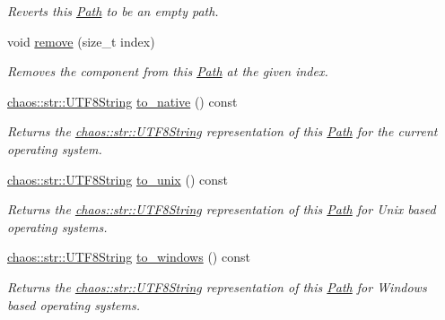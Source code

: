 \begin{DoxyCompactItemize}
\begin{DoxyCompactList}\small\item\em Reverts this \hyperlink{classchaos_1_1io_1_1file_1_1_path}{Path} to be an empty path. \end{DoxyCompactList}\item 
void \hyperlink{classchaos_1_1io_1_1file_1_1_path_a0155409783770f5db3f6303cd5191840}{remove} (size\+\_\+t index)
\begin{DoxyCompactList}\small\item\em Removes the component from this \hyperlink{classchaos_1_1io_1_1file_1_1_path}{Path} at the given index. \end{DoxyCompactList}\item 
\hyperlink{classchaos_1_1str_1_1_u_t_f8_string}{chaos\+::str\+::\+U\+T\+F8\+String} \hyperlink{classchaos_1_1io_1_1file_1_1_path_a7e156426c4f08f1798d0138c24bd9147}{to\+\_\+native} () const 
\begin{DoxyCompactList}\small\item\em Returns the \hyperlink{classchaos_1_1str_1_1_u_t_f8_string}{chaos\+::str\+::\+U\+T\+F8\+String} representation of this \hyperlink{classchaos_1_1io_1_1file_1_1_path}{Path} for the current operating system. \end{DoxyCompactList}\item 
\hyperlink{classchaos_1_1str_1_1_u_t_f8_string}{chaos\+::str\+::\+U\+T\+F8\+String} \hyperlink{classchaos_1_1io_1_1file_1_1_path_a348fc601d312d89c054cd5e02ff97edb}{to\+\_\+unix} () const 
\begin{DoxyCompactList}\small\item\em Returns the \hyperlink{classchaos_1_1str_1_1_u_t_f8_string}{chaos\+::str\+::\+U\+T\+F8\+String} representation of this \hyperlink{classchaos_1_1io_1_1file_1_1_path}{Path} for Unix based operating systems. \end{DoxyCompactList}\item 
\hyperlink{classchaos_1_1str_1_1_u_t_f8_string}{chaos\+::str\+::\+U\+T\+F8\+String} \hyperlink{classchaos_1_1io_1_1file_1_1_path_a0754e72d891932146764d8563fb3a6bb}{to\+\_\+windows} () const 
\begin{DoxyCompactList}\small\item\em Returns the \hyperlink{classchaos_1_1str_1_1_u_t_f8_string}{chaos\+::str\+::\+U\+T\+F8\+String} representation of this \hyperlink{classchaos_1_1io_1_1file_1_1_path}{Path} for Windows based operating systems. \end{DoxyCompactList}\item 

\end{DoxyCompactItemize}
